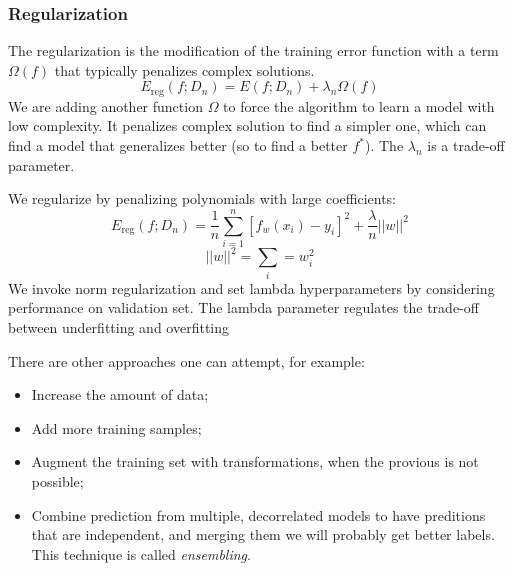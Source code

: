\subsubsection{Regularization}
The regularization is the modification of the training error function with a term \(\Omega(f)\) that typically penalizes complex solutions.
\[E_{\text{reg}}(f;D_n) = E(f;D_n) + \lambda_n \Omega (f)\]
We are adding another function \(\Omega\) to force the algorithm to learn a model with low complexity. It penalizes complex solution to find a simpler one, which can find a model that generalizes better (so to find a better \(f^*\)). The \(\lambda_n\) is a trade-off parameter.

\begin{example}
We regularize by penalizing polynomials with large coefficients:
\[E_{\text{reg}}(f;D_n) = \frac 1 n \sum_{i=1}^n [f_w(x_i)-y_i]^2 + \frac \lambda n ||w||^2\]
\[||w||^2 = \sum_i=w_i^2\]
We invoke norm regularization and set lambda hyperparameters by considering performance on validation set. The lambda parameter regulates the trade-off between underfitting and overfitting



\end{example}

There are other approaches one can attempt, for example:
\begin{itemize}
    \item
    Increase the amount of data;
    \item
    Add more training samples;
    \item
    Augment the training set with transformations, when the provious is not possible;
    \item
    Combine prediction from multiple, decorrelated models to have preditions that are independent, and merging them we will probably get better labels. This technique is called \emph{ensembling}.
\end{itemize}

